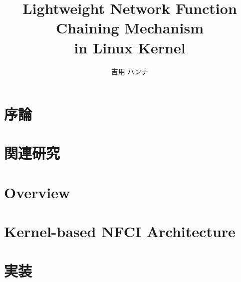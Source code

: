 \documentclass[12pt]{b-thesis}
\begin{document}
\title{Lightweight Network Function Chaining Mechanism \\ in Linux Kernel}
\author{吉用 ハンナ}
\maketitle

 
\makejabstract 

\clearpage


\setcounter{page}{1}

\tableofcontents
\thispagestyle{plain}

\listoffigures   %
\listoftables    %

\clearpage

\pagestyle{headings}
\setcounter{page}{1}

\clearpage

\chapter{序論}
\label{chap:intro}


\chapter{関連研究}
\label{chap:related}


\chapter{Overview}
\label{chap:overview}


\chapter{Kernel-based NFCI Architecture}
\label{chap:architecture}


\chapter{実装}
\label{chap:implementation}

\end{document}
